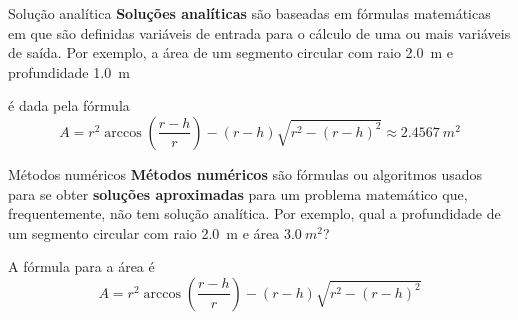 \begin{frame}{Solução analítica}
    \textbf{Soluções analíticas} são baseadas em fórmulas matemáticas em que
    são definidas variáveis de entrada para o cálculo de uma ou mais variáveis
    de saída. Por exemplo, a área de um segmento circular com raio \SI{2.0}{m}
    e profundidade \SI{1.0}{m}

    \begin{center}
    \end{center}
    é dada pela fórmula
    \[
        A=r^2 \arccos{\left(\frac{r-h}{r}\right)}-(r-h)\sqrt{r^2-(r-h)^2} 
        \approx \SI{2.4567}{m^2}
    \]
\end{frame}

\begin{frame}{Métodos numéricos}
    \textbf{Métodos numéricos} são fórmulas ou algoritmos usados para se obter
    \textbf{soluções aproximadas} para um problema matemático que,
    frequentemente, não tem solução analítica. Por exemplo, qual a profundidade
    de um segmento circular com raio \SI{2.0}{m} e área \(\SI{3.0}{m^2}\)?

    \begin{center}
    \end{center}

    A fórmula para a área é
    \[
        A=r^2 \arccos{\left(\frac{r-h}{r}\right)}-(r-h)\sqrt{r^2-(r-h)^2}
    \]
\end{frame}

